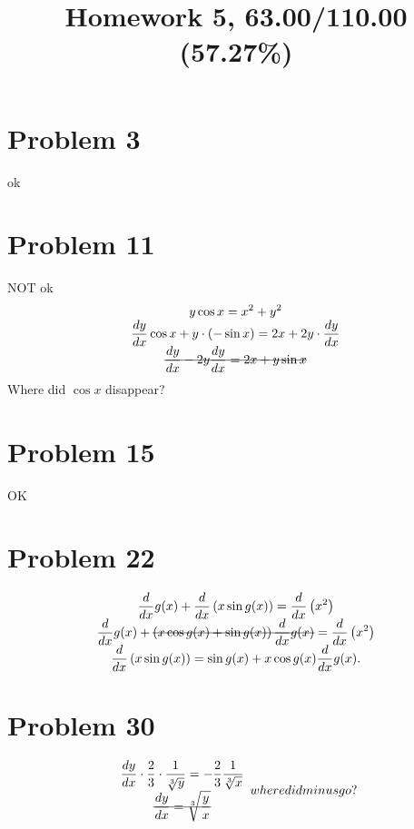 \documentclass[10pt]{article} %
\title{Homework 5,
63.00/110.00 (57.27\%)
}
\begin{document}
\maketitle

\section*{Problem 3 }
ok
\section*{Problem 11 }
NOT ok
\begin{equation*}
	\begin{array}[]{c}
	\displaystyle y \cos x=x^2+y^2\\
	\displaystyle\frac{{dy}}{{dx}}\cos x+y\cdot(-\sin x)=2x+2y\cdot\frac{dy}{dx}\\
	\mbox{\sout{$\displaystyle\frac{dy}{dx}-2y\frac{dy}{dx}
		=2x+y\sin x$}}
	\end{array}
\end{equation*}
Where did $\cos x$ disappear?
\section*{Problem 15 }
OK
\section*{Problem 22 }
\begin{equation*}
	\begin{array}[]{c}
		\displaystyle\frac{d}{dx}g(x)+\frac{d}{dx}\left( x\sin g(x) \right)=\frac{d}{dx}\left( x^2 \right)\\
		\displaystyle\frac{d}{dx}g(x)+\mbox{\sout{$
			\displaystyle\left( x\cos g(x)+\sin g(x) \right)\frac{d}{dx}g(x)
		$}}
		=\frac{d}{dx}\left( x^2 \right)
		\\
		\displaystyle\frac{d}{dx}\left( x\sin g(x) \right)=\sin g(x)+x\cos g(x)\frac{d}{dx}g(x).
	\end{array}
\end{equation*}
\section*{Problem 30 }
\begin{equation*}
	\begin{array}[]{c}
		\displaystyle\frac{dy}{dx}\cdot\frac{2}{3}\cdot\frac{1}{\sqrt[3]{y}}=-\frac{2}{3}
		\frac{1}{\sqrt[3]{x}}\\
		\mbox{\sout{$\displaystyle
		\frac{dy}{dx}=\sqrt[3]{\frac{y}{x}}
		$}}
	\end{array}
	where did minus go?
\end{equation*}
\end{document}
